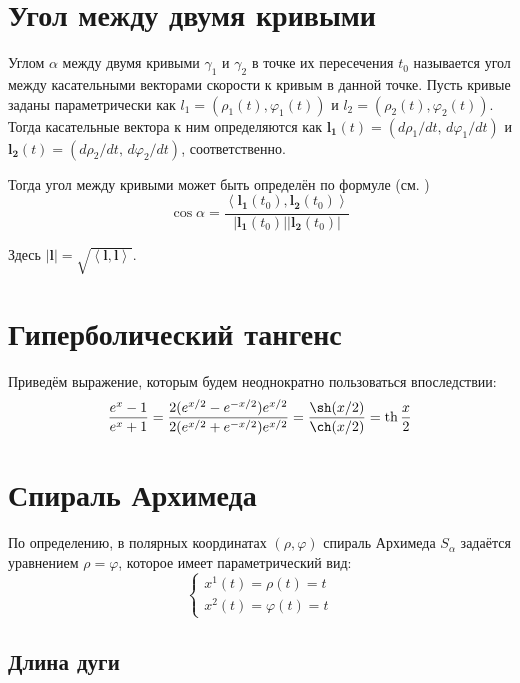 \documentclass{article}
\numberwithin{equation}{section}
\renewcommand{\phi}{\varphi}
\newcommand{\scalmult}[2]{{\left \langle #1 \right \rangle}_{#2}}
\renewcommand{\vec}{\mathbf}
\renewcommand{\th}{\operatorname{th}}
\providecommand{\abs}[1]{\left \lvert{#1}\right \rvert}
\begin{document}
\section{Угол между двумя кривыми}

Углом $\alpha$ между двумя кривыми $\gamma_1$ и $\gamma_2$ в точке их
пересечения $t_0$ называется угол между касательными векторами
скорости к кривым в данной точке. Пусть кривые заданы параметрически
как $l_1 = (\rho_1(t), \phi_1(t))$ и $l_2 = (\rho_2(t), \phi_2(t))$.
Тогда касательные вектора к ним определяются как $\vec{l_1}(t) =
(d\rho_1/dt,\,d\phi_1/dt)$ и $\vec{l_2}(t) =
(d\rho_2/dt,\,d{\phi_2}/dt)$, соответственно.

Тогда угол между
кривыми может быть определён по формуле (см. \cite{dubrovin98})
\begin{equation}\label{eq:curves-angle}
  \cos \alpha = \frac{\scalmult{\vec{l_1}(t_0), \vec{l_2}(t_0)}{}}{\abs{\vec{l_1}(t_0)} \abs{\vec{l_2}(t_0)}}
\end{equation}

Здесь $\abs{\vec{l}} = \sqrt{\scalmult{\vec{l},\vec{l}}{}}$.

\section{Гиперболический тангенс}

Приведём выражение, которым будем неоднократно пользоваться впоследствии:
\begin{equation}\label{eq:tanh}
  \frac{e^x-1}{e^x+1} =
  \frac{2(e^{x/2}-e^{-x/2})e^{x/2}}{2(e^{x/2}+e^{-x/2})e^{x/2}}
  = \frac{\sh(x/2)}{\ch(x/2)} = \th{\frac{x}{2}}
\end{equation}

\clearpage

\section{Спираль Архимеда}

По определению, в полярных координатах $(\rho, \phi)$ спираль Архимеда
$S_\alpha$ задаётся уравнением $\rho = \phi$, которое имеет
параметрический вид:
\begin{equation}\label{eq:arch-spiral}
  \begin{cases}
    x^1(t) = \rho(t) = t \\
    x^2(t) = \phi(t) = t
  \end{cases}
\end{equation}

\subsection{Длина дуги}
\end{document}
